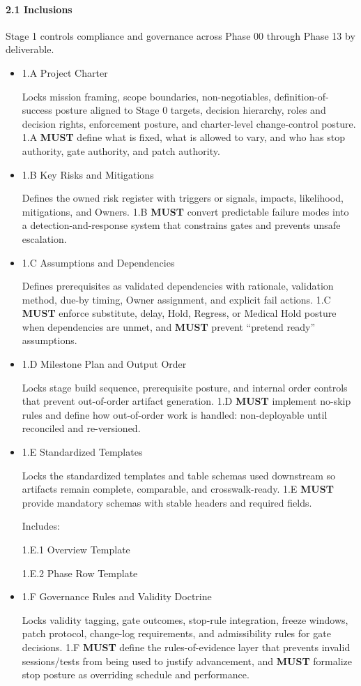 \documentclass[10pt]{article}
\begin{document}
\paragraph*{2.1 Inclusions}

Stage 1 controls compliance and governance across Phase 00 through Phase 13 by deliverable.

\begin{itemize}
\item 1.A Project Charter

Locks mission framing, scope boundaries, non-negotiables, definition-of-success posture aligned to Stage 0 targets, decision hierarchy, roles and decision rights, enforcement posture, and charter-level change-control posture. 1.A \textbf{MUST} define what is fixed, what is allowed to vary, and who has stop authority, gate authority, and patch authority.

\item 1.B Key Risks and Mitigations

Defines the owned risk register with triggers or signals, impacts, likelihood, mitigations, and Owners. 1.B \textbf{MUST} convert predictable failure modes into a detection-and-response system that constrains gates and prevents unsafe escalation.

\item 1.C Assumptions and Dependencies

Defines prerequisites as validated dependencies with rationale, validation method, due-by timing, Owner assignment, and explicit fail actions. 1.C \textbf{MUST} enforce substitute, delay, Hold, Regress, or Medical Hold posture when dependencies are unmet, and \textbf{MUST} prevent “pretend ready” assumptions.

\item 1.D Milestone Plan and Output Order

Locks stage build sequence, prerequisite posture, and internal order controls that prevent out-of-order artifact generation. 1.D \textbf{MUST} implement no-skip rules and define how out-of-order work is handled: non-deployable until reconciled and re-versioned.

\item 1.E Standardized Templates

Locks the standardized templates and table schemas used downstream so artifacts remain complete, comparable, and crosswalk-ready. 1.E \textbf{MUST} provide mandatory schemas with stable headers and required fields.

Includes:

1.E.1 Overview Template

1.E.2 Phase Row Template

\item 1.F Governance Rules and Validity Doctrine

Locks validity tagging, gate outcomes, stop-rule integration, freeze windows, patch protocol, change-log requirements, and admissibility rules for gate decisions. 1.F \textbf{MUST} define the rules-of-evidence layer that prevents invalid sessions/tests from being used to justify advancement, and \textbf{MUST} formalize stop posture as overriding schedule and performance.
\end{itemize}
\end{document}
